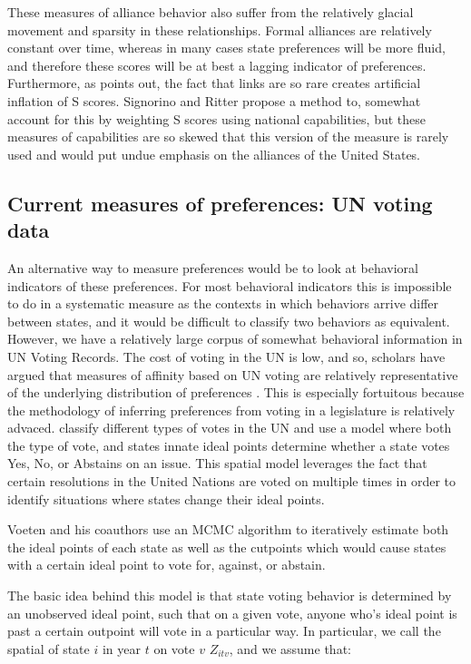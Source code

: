 \documentclass[fignum,letterpaper,12pt]{amsart}
\begin{document}
These measures of alliance behavior also suffer from the relatively glacial movement and sparsity in these relationships. Formal alliances are relatively constant over time, whereas in many cases state preferences will be more fluid, and therefore these scores will be at best a lagging indicator of preferences. Furthermore, as \citet{hage:2011} points out, the fact that links are so rare creates artificial inflation of S scores. Signorino and Ritter propose a method to, somewhat account for this by weighting S scores using national capabilities, but these measures of capabilities are so skewed that this version of the measure is rarely used and would put undue emphasis on the alliances of the United States.

\subsection{Current measures of preferences: UN voting data}
An alternative way to measure preferences would be to look at behavioral indicators of these preferences. For most behavioral indicators this is impossible to do in a systematic measure as the contexts in which behaviors arrive differ between states, and it would be difficult to classify two behaviors as equivalent. However, we have a relatively large corpus of somewhat behavioral information in UN Voting Records. The cost of voting in the UN is low, and so, scholars have argued that measures of affinity based on UN voting are relatively representative of the underlying distribution of preferences \citep{gartzke:1998}. This is especially fortuitous because the methodology of inferring preferences from voting in a legislature is relatively advaced. \citet{voeten} classify different types of votes in the UN and use a model where both the type of vote, and states innate ideal points determine whether a state votes Yes, No, or Abstains on an issue. This spatial model leverages the fact that certain resolutions in the United Nations are voted on multiple times in order to identify situations where states change their ideal points.

Voeten and his coauthors use an MCMC algorithm to iteratively estimate both the ideal points of each state as well as the cutpoints which would cause states with a certain ideal point to vote for, against, or abstain.

The basic idea behind this model is that state voting behavior is determined by an unobserved ideal point, such that on a given vote, anyone who's ideal point is past a certain outpoint will vote in a particular way. In particular, we call the spatial of  state $i$ in year $t$  on vote $v$ $Z_{itv} $, and we assume that:
\end{document}
